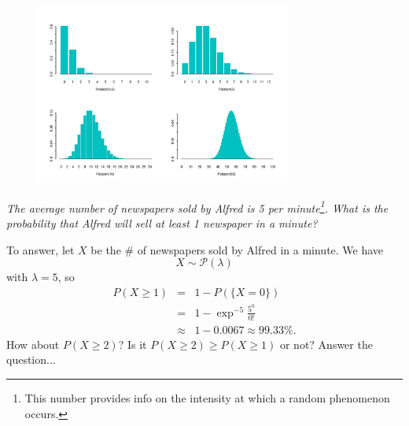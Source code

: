 \documentclass[smaller]{beamer}\usepackage[]{graphicx}\usepackage[]{color}
\begin{document}
\begin{frame}{\secname}
  \begin{figure}[ptb]\centering
  \includegraphics[width=0.75\textwidth]{img/distpois.pdf}
  \end{figure}
\end{frame}


\begin{frame}{\secname}
  \begin{example}
  \begin{footnotesize}
  \emph{The average number of newspapers sold by Alfred is 5 per minute\footnote{This number provides info on the intensity
  at which a random phenomenon occurs.}. What is the probability that Alfred will sell at least 1 newspaper in a minute?} \medskip
  \pause

  To answer, let $X$ be the $\#$ of newspapers sold by Alfred in a minute. We have
  $$
  X \sim \mathcal{P}(\lambda)
  $$
  with $\lambda = 5$, so
  \begin{eqnarray*}
  P(X \geq 1) & = & 1- P(\{X=0\}) \\
  & = & 1 - \exp^{-5} \frac{5^0}{0!} \\
  & \approx & 1- 0.0067 \approx 99.33\%.
  \end{eqnarray*}
  How about $P(X \geq 2)$? Is it $P(X \geq 2) \geq P(X \geq 1)$ or not? Answer the question...
  \end{footnotesize}
  \end{example}
\end{frame}
\end{document}
